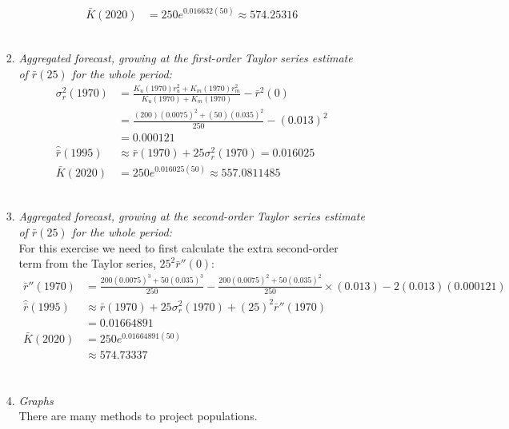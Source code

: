 \documentclass[]{book}
\begin{document}
\begin{enumerate}
\begin{enumerate}
\begin{enumerate}
\[\begin{aligned}
       \bar{K}(2020) &= 250e^{0.016632(50)} \approx 574.25316
       \end{aligned}\]\\
    \item
      \emph{Aggregated forecast, growing at the first-order Taylor series estimate of \(\bar{r}(25)\) for the whole period:}\\
      \[\begin{aligned}
       \sigma^2_r(1970) &= \frac{K_u(1970)r_u^2 + K_m(1970)r_m^2} {K_u(1970) + K_m(1970)} - \bar{r}^2(0) \\
       & =  \frac{(200)(0.0075)^2 + (50)(0.035)^2}{250}-(0.013)^2 \\
       & = 0.000121 \\
       \hat{\bar{r}}(1995) & \approx \bar{r}(1970) + 25\sigma^2_r(1970) =  0.016025 \\ 
       \bar{K}(2020) &= 250 e^{0.016025(50)} \approx 557.0811485
       \end{aligned}\]\\
    \item
      \emph{Aggregated forecast, growing at the second-order Taylor series estimate of \(\bar{r}(25)\) for the whole period:}\\
      For this exercise we need to first calculate the extra second-order term from the Taylor series, \(25^2\bar{r}''(0)\):\\
      \[\begin{aligned}
       \bar{r}''(1970) &= \frac{200(0.0075)^3+50(0.035)^3}{250} - \frac{200(0.0075)^2+50(0.035)^2}{250} \times (0.013) - 2(0.013)(0.000121)\\
       \hat{\bar{r}}(1995) & \approx \bar{r}(1970) + 25\sigma^2_r(1970) +(25)^2\bar{r}''(1970) \\
       & =  0.01664891\\
       \bar{K}(2020) &= 250 e^{0.01664891(50)} \\
       & \approx 574.73337 \\
       \end{aligned}\]\\
    \item
      \emph{Graphs}\\
      There are many methods to project populations.
    \end{enumerate}


\end{enumerate}
\end{enumerate}
\end{document}
